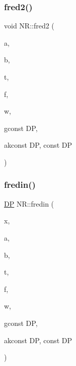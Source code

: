 \subsubsection{\texorpdfstring{fred2()}{fred2()}}
{\footnotesize\ttfamily void N\+R\+::fred2 (\begin{DoxyParamCaption}\item[{const \mbox{\hyperlink{namespaceNR_af6ff762dd605ff477b8e52387253a02a}{DP}}}]{a,  }\item[{const \mbox{\hyperlink{namespaceNR_af6ff762dd605ff477b8e52387253a02a}{DP}}}]{b,  }\item[{\mbox{\hyperlink{namespaceNR_a970094d23441f8ef6a45282a7eb2103d}{Vec\+\_\+\+O\+\_\+\+DP}} \&}]{t,  }\item[{\mbox{\hyperlink{namespaceNR_a970094d23441f8ef6a45282a7eb2103d}{Vec\+\_\+\+O\+\_\+\+DP}} \&}]{f,  }\item[{\mbox{\hyperlink{namespaceNR_a970094d23441f8ef6a45282a7eb2103d}{Vec\+\_\+\+O\+\_\+\+DP}} \&}]{w,  }\item[{\mbox{\hyperlink{namespaceNR_af6ff762dd605ff477b8e52387253a02a}{DP}} }]{gconst DP,  }\item[{\mbox{\hyperlink{namespaceNR_af6ff762dd605ff477b8e52387253a02a}{DP}} }]{akconst D\+P, const DP }\end{DoxyParamCaption})}

\mbox{\label{namespaceNR_a447051a2ce2f777db5fabc349d9d7904}} 
\subsubsection{\texorpdfstring{fredin()}{fredin()}}
{\footnotesize\ttfamily \mbox{\hyperlink{namespaceNR_af6ff762dd605ff477b8e52387253a02a}{DP}} N\+R\+::fredin (\begin{DoxyParamCaption}\item[{const \mbox{\hyperlink{namespaceNR_af6ff762dd605ff477b8e52387253a02a}{DP}}}]{x,  }\item[{const \mbox{\hyperlink{namespaceNR_af6ff762dd605ff477b8e52387253a02a}{DP}}}]{a,  }\item[{const \mbox{\hyperlink{namespaceNR_af6ff762dd605ff477b8e52387253a02a}{DP}}}]{b,  }\item[{\mbox{\hyperlink{namespaceNR_a9f943da53862537c552e2a770cb170ae}{Vec\+\_\+\+I\+\_\+\+DP}} \&}]{t,  }\item[{\mbox{\hyperlink{namespaceNR_a9f943da53862537c552e2a770cb170ae}{Vec\+\_\+\+I\+\_\+\+DP}} \&}]{f,  }\item[{\mbox{\hyperlink{namespaceNR_a9f943da53862537c552e2a770cb170ae}{Vec\+\_\+\+I\+\_\+\+DP}} \&}]{w,  }\item[{\mbox{\hyperlink{namespaceNR_af6ff762dd605ff477b8e52387253a02a}{DP}} }]{gconst DP,  }\item[{\mbox{\hyperlink{namespaceNR_af6ff762dd605ff477b8e52387253a02a}{DP}} }]{akconst D\+P, const DP }\end{DoxyParamCaption})}

